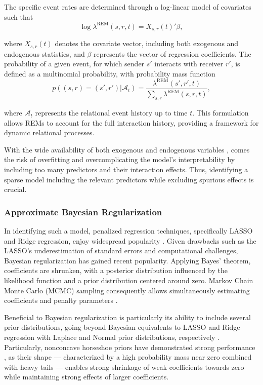 \documentclass{article}
\begin{document}
\begin{spacing}{2}
\begin{justify}
The specific event rates are determined through a log-linear model of covariates such that
\begin{equation}
    \log \lambda^{\text{REM}}(s,r,t) = X_{s,r}(t)'\beta, \label{eq:rem_equation}
\end{equation}

where $X_{s,r}(t)$ denotes the covariate vector, including both exogenous and endogenous statistics, and $\beta$ represents the vector of regression coefficients. The probability of a given event, for which sender $s'$ interacts with receiver $r'$, is defined as a multinomial probability, with probability mass function
\begin{equation}
p((s, r) = (s', r') | \mathcal{A}_t) = \frac{\lambda^{\text{REM}}(s', r', t)}{\sum_{s, r} \lambda^{\text{REM}}(s, r, t)}, \label{eq:rem_multinomial}
\end{equation}

where $\mathcal{A}_t$ represents the relational event history up to time $t$. This formulation allows REMs to account for the full interaction history, providing a framework for dynamic relational processes.

With the wide availability of both exogenous and endogenous variables \citep{Butts2008}, comes the risk of overfitting and overcomplicating the model's interpretability by including too many predictors and their interaction effects. Thus, identifying a sparse model including the relevant predictors while excluding spurious effects is crucial.

\subsubsection{Approximate Bayesian Regularization}

In identifying such a model, penalized regression techniques, specifically LASSO and Ridge regression, enjoy widespread popularity \citep{Hoerl1970, Tibshirani1996}. Given drawbacks such as the LASSO’s underestimation of standard errors \citep{Casella2010} and computational challenges, Bayesian regularization has gained recent popularity. Applying Bayes' theorem, coefficients are shrunken, with a posterior distribution influenced by the likelihood function and a prior distribution centered around zero. Markov Chain Monte Carlo (MCMC) sampling consequently allows simultaneously estimating coefficients and penalty parameters \citep{vanErp2019}. 

Beneficial to Bayesian regularization is particularly its ability to include several prior distributions, going beyond Bayesian equivalents to LASSO and Ridge regression with Laplace and Normal prior distributions, respectively \citep{Park2008, Loesgen1990}. Particularly, nonconcave horseshoe priors \citep{Carvalho2010} have demonstrated strong performance \citep{vanErp2019}, as their shape — characterized by a high probability mass near zero combined with heavy tails — enables strong shrinkage of weak coefficients towards zero while maintaining strong effects of larger coefficients. 


\end{justify}
\end{spacing}
\end{document}
